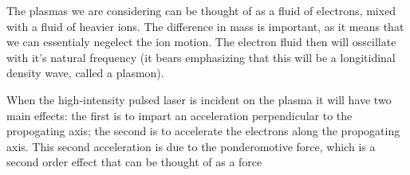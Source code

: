 \documentclass[12pt, titlepage]{article}
\begin{document}
    The plasmas we are considering can be thought of as a fluid of electrons,
    mixed with a fluid of heavier ions. The difference in mass is important, as
    it means that we can essentialy negelect the ion motion. The electron fluid
    then will osscillate with it's natural frequency (it bears emphasizing that
    this will be a longitidinal density wave, called a plasmon). 

    When the high-intensity pulsed laser is incident on the plasma it will have
    two main effects: the first is to impart an acceleration perpendicular to
    the propogating axis; the second is to accelerate the electrons along the
    propogating axis. This second acceleration is due to the ponderomotive
    force, which is a second order effect that can be thought of as a force
\end{document}
